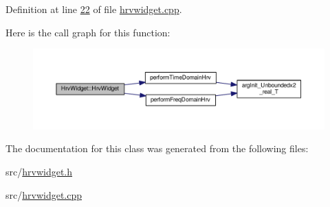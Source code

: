 Definition at line \hyperlink{hrvwidget_8cpp_source_l00022}{22} of file \hyperlink{hrvwidget_8cpp_source}{hrvwidget.\+cpp}.



Here is the call graph for this function\+:
\nopagebreak
\begin{figure}[H]
\begin{center}
\leavevmode
\includegraphics[width=350pt]{classHrvWidget_adfd3a1b7a3c35e4380208cbe8d620c88_cgraph}
\end{center}
\end{figure}




The documentation for this class was generated from the following files\+:\begin{DoxyCompactItemize}
\item 
src/\hyperlink{hrvwidget_8h}{hrvwidget.\+h}\item 
src/\hyperlink{hrvwidget_8cpp}{hrvwidget.\+cpp}\end{DoxyCompactItemize}
